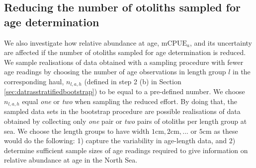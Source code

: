 \documentclass[a4paper 12pt]{article}
\numberwithin{equation}{section}
\begin{document}
\subsection{Reducing the number of otoliths sampled for age determination}
\label{sec:reducingeffort}
We also investigate how relative abundance at age, $\text{mCPUE}_a$, and its uncertainty are affected if the  number of otoliths sampled for age determination is reduced. We sample realisations of data obtained with a sampling procedure with fewer age readings by choosing the number of age observations in length group $l$ in the corresponding haul,  $n_{l,a,h}$ (defined in step 2 (b) in Section \ref{sec:datrasstratifiedbootstrap}) to be equal to a pre-defined number. We choose $n_{l,a,h}$ equal \textit{one} or \textit{two} when sampling the reduced effort. By doing that, the sampled data sets in the bootstrap procedure are possible realisations of data obtained by collecting only \textit{one} pair or \textit{two} pairs of otoliths per length group at sea. We choose the length groups to have width $1 \text{cm},2\text{cm},...\text{ or }5\text{cm}$ as these would do the following: 1) capture the variability in age-length data, and 2) determine sufficient sample sizes of age readings required to give information on relative abundance at age in the North Sea.
\end{document}
